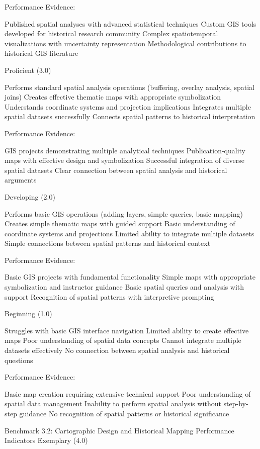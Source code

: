 \begin{appendices}
Performance Evidence:

Published spatial analyses with advanced statistical techniques
Custom GIS tools developed for historical research community
Complex spatiotemporal visualizations with uncertainty representation
Methodological contributions to historical GIS literature

Proficient (3.0)

Performs standard spatial analysis operations (buffering, overlay analysis, spatial joins)
Creates effective thematic maps with appropriate symbolization
Understands coordinate systems and projection implications
Integrates multiple spatial datasets successfully
Connects spatial patterns to historical interpretation

Performance Evidence:

GIS projects demonstrating multiple analytical techniques
Publication-quality maps with effective design and symbolization
Successful integration of diverse spatial datasets
Clear connection between spatial analysis and historical arguments

Developing (2.0)

Performs basic GIS operations (adding layers, simple queries, basic mapping)
Creates simple thematic maps with guided support
Basic understanding of coordinate systems and projections
Limited ability to integrate multiple datasets
Simple connections between spatial patterns and historical context

Performance Evidence:

Basic GIS projects with fundamental functionality
Simple maps with appropriate symbolization and instructor guidance
Basic spatial queries and analysis with support
Recognition of spatial patterns with interpretive prompting

Beginning (1.0)

Struggles with basic GIS interface navigation
Limited ability to create effective maps
Poor understanding of spatial data concepts
Cannot integrate multiple datasets effectively
No connection between spatial analysis and historical questions

Performance Evidence:

Basic map creation requiring extensive technical support
Poor understanding of spatial data management
Inability to perform spatial analysis without step-by-step guidance
No recognition of spatial patterns or historical significance

Benchmark 3.2: Cartographic Design and Historical Mapping
Performance Indicators
Exemplary (4.0)


\end{appendices}
